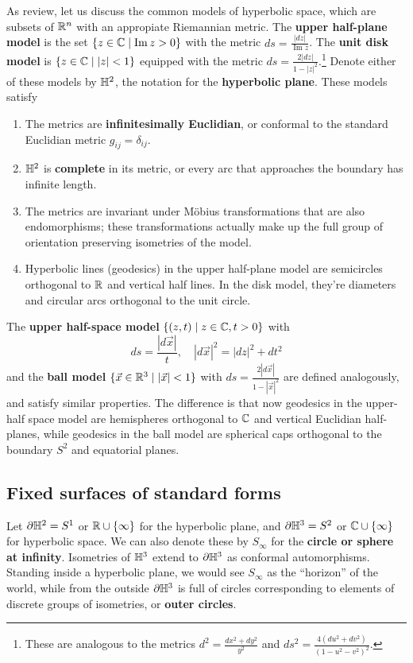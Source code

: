 As review, let us discuss the common models of hyperbolic space, which are subsets of $\mathbb{R}^n $ with an appropiate Riemannian metric. The \textbf{upper half-plane model} is the set $\{z \in \mathbb{C}\mid \operatorname{Im}z >0\} $ with the metric $ds= \frac{|dz|}{\operatorname{Im}z}$. The \textbf{unit disk model} is $\{z \in \mathbb{C} \mid |z|< 1\} $ equipped with the metric $ds= \frac{2|dz|}{1-|z|^2}$.\footnote{These are analogous to the metrics $d^2 = \frac{dx^2+dy^2}{y^2}$ and $ds ^2= \frac{4(du ^2+dv ^2)}{(1-u^2-v^2)^2}$.}  Denote either of these models by $\mathbb{H}^2$, the notation for the \textbf{hyperbolic plane}. These models satisfy
\begin{enumerate}[label=(\roman*)]
    \item The metrics are \textbf{infinitesimally Euclidian}, or conformal to the standard Euclidian metric $g_{ij}=\delta _{ij}$.
    \item $\mathbb{H}^2$ is \textbf{complete} in its metric, or every arc that approaches the boundary has infinite length.
    \item The metrics are invariant under M\"obius transformations that are also endomorphisms; these transformations actually make up the full group of orientation preserving isometries of the model.
    \item Hyperbolic lines (geodesics) in the upper half-plane model are semicircles orthogonal to $\mathbb{R}$ and vertical half lines. In the disk model, they're diameters and circular arcs orthogonal to the unit circle.
\end{enumerate}
The \textbf{upper half-space model} $\{(z,t) \mid z \in \mathbb{C}, t>0\} $ with 
\[
ds= \frac{|d \vec x|}{t},\quad |d\vec x|^2 = |dz|^2+dt^2
\] 
and the \textbf{ball model} $\{\vec x \in \mathbb{R}^3 \mid  |\vec x|<1\} $ with $ds= \frac{2|d\vec x|}{1- |\vec x|^2}$ are defined analogously, and satisfy similar properties. The difference is that now geodesics in the upper-half space model are hemispheres orthogonal to $\mathbb{C}$ and vertical Euclidian half-planes, while geodesics in the ball model are spherical caps orthogonal to the boundary $S^2$ and equatorial planes.

\subsection{Fixed surfaces of standard forms}

Let $\partial \mathbb{H}^2= S^1 $ or $\mathbb{R} \cup \{\infty\} $ for the hyperbolic plane, and $\partial \mathbb{H}^3=S^2$ or $\mathbb{C}\cup \{\infty\} $ for hyperbolic space. We can also denote these by $S_{\infty}$ for the \textbf{circle or sphere at infinity}. Isometries of $\mathbb{H}^3$ extend to $\partial \mathbb{H} ^3$ as conformal automorphisms. Standing inside a hyperbolic plane, we would see $S_{\infty}$ as the ``horizon'' of the world, while from the outside $\partial \mathbb{H}^3$ is full of circles corresponding to elements of discrete groups of isometries, or \textbf{outer circles}.

